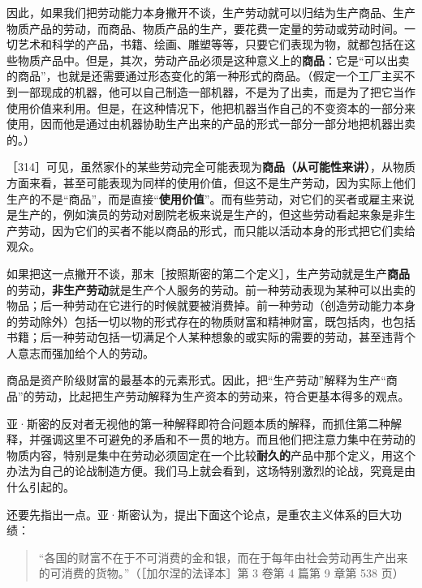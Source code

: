 因此，如果我们把劳动能力本身撇开不谈，生产劳动就可以归结为生产商品、生产物质产品的劳动，而商品、物质产品的生产，要花费一定量的劳动或劳动时间。一切艺术和科学的产品，书籍、绘画、雕塑等等，只要它们表现为物，就都包括在这些物质产品中。但是，其次，劳动产品必须是这种意义上的\textbf{商品}：它是“可以出卖的商品”，也就是还需要通过形态变化的第一种形式的商品。（假定一个工厂主买不到一部现成的机器，他可以自己制造一部机器，不是为了出卖，而是为了把它当作使用价值来利用。但是，在这种情况下，他把机器当作自己的不变资本的一部分来使用，因而他是通过由机器协助生产出来的产品的形式一部分一部分地把机器出卖的。）

［314］可见，虽然家仆的某些劳动完全可能表现为\textbf{商品（从可能性来讲）}，从物质方面来看，甚至可能表现为同样的使用价值，但这不是生产劳动，因为实际上他们生产的不是“商品”，而是直接“\textbf{使用价值}”。而有些劳动，对它们的买者或雇主来说是生产的，例如演员的劳动对剧院老板来说是生产的，但这些劳动看起来象是非生产劳动，因为它们的买者不能以商品的形式，而只能以活动本身的形式把它们卖给观众。

如果把这一点撇开不谈，那末［按照斯密的第二个定义］，生产劳动就是生产\textbf{商品}的劳动，\textbf{非生产劳动}就是生产个人服务的劳动。前一种劳动表现为某种可以出卖的物品；后一种劳动在它进行的时候就要被消费掉。前一种劳动（创造劳动能力本身的劳动除外）包括一切以物的形式存在的物质财富和精神财富，既包括肉，也包括书籍；后一种劳动包括一切满足个人某种想象的或实际的需要的劳动，甚至违背个人意志而强加给个人的劳动。

商品是资产阶级财富的最基本的元素形式。因此，把“生产劳动”解释为生产“商品”的劳动，比起把生产劳动解释为生产资本的劳动来，符合更基本得多的观点。

亚·斯密的反对者无视他的第一种解释即符合问题本质的解释，而抓住第二种解释，并强调这里不可避免的矛盾和不一贯的地方。而且他们把注意力集中在劳动的物质内容，特别是集中在劳动必须固定在一个比较\textbf{耐久的}产品中那个定义，用这个办法为自己的论战制造方便。我们马上就会看到，这场特别激烈的论战，究竟是由什么引起的。

还要先指出一点。亚·斯密认为，提出下面这个论点，是重农主义体系的巨大功绩：

\begin{quote}“各国的财富不在于不可消费的金和银，而在于每年由社会劳动再生产出来的可消费的货物。”（［加尔涅的法译本］第 3 卷第 4 篇第 9 章第 538 页）\end{quote}

